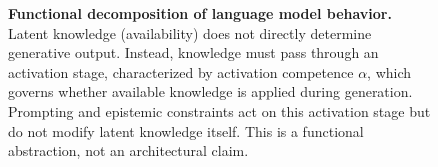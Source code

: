 \begin{figure}[t]

\caption{\textbf{Functional decomposition of language model behavior.} Latent knowledge (availability) does not directly determine generative output. Instead, knowledge must pass through an activation stage, characterized by activation competence $\alpha$, which governs whether available knowledge is applied during generation. Prompting and epistemic constraints act on this activation stage but do not modify latent knowledge itself. This is a functional abstraction, not an architectural claim.}
\label{fig:activation-model}
\end{figure}


